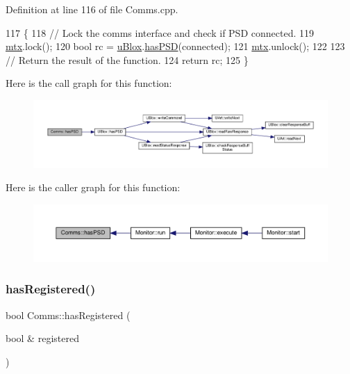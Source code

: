 Definition at line 116 of file Comms.\+cpp.


\begin{DoxyCode}
117 \{
118     \textcolor{comment}{// Lock the comms interface and check if PSD connected.}
119     \hyperlink{class_comms_a21df861b1202573e4cd0cb5666d638fe}{mtx}.lock();
120     \textcolor{keywordtype}{bool} rc = \hyperlink{class_comms_ac64dea134b116147e5441172346dbd6c}{uBlox}.\hyperlink{class_u_blox_ae49b51a602a327b5eff5b04d2ccaec20}{hasPSD}(connected);
121     \hyperlink{class_comms_a21df861b1202573e4cd0cb5666d638fe}{mtx}.unlock();
122 
123     \textcolor{comment}{// Return the result of the function.}
124     \textcolor{keywordflow}{return} rc;
125 \}
\end{DoxyCode}
Here is the call graph for this function\+:
\nopagebreak
\begin{figure}[H]
\begin{center}
\leavevmode
\includegraphics[width=350pt]{d8/dcc/class_comms_a2c43ce409b48f4d28eefb7934cdd1523_cgraph}
\end{center}
\end{figure}
Here is the caller graph for this function\+:
\nopagebreak
\begin{figure}[H]
\begin{center}
\leavevmode
\includegraphics[width=350pt]{d8/dcc/class_comms_a2c43ce409b48f4d28eefb7934cdd1523_icgraph}
\end{center}
\end{figure}
\mbox{\label{class_comms_ae1fb7ac11bd07f21134335aec55bd833}} 
\subsubsection{\texorpdfstring{has\+Registered()}{hasRegistered()}}
{\footnotesize\ttfamily bool Comms\+::has\+Registered (\begin{DoxyParamCaption}\item[{bool \&}]{registered }\end{DoxyParamCaption})}

